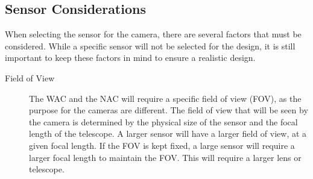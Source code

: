 \subsection{Sensor Considerations}
When selecting the sensor for the camera, there are several factors that must be considered. While a specific sensor will not be selected for the design, it is still important to keep these factors in mind to ensure a realistic design.  
\begin{description}
\item[Field of View] The WAC and the NAC will require a specific field of view (FOV), as the purpose for the cameras are different. The field of view that will be seen by the camera is determined by the physical size of the sensor and the focal length of the telescope. A larger sensor will have a larger field of view, at a given focal length. If the FOV is kept fixed, a large sensor will require a larger focal length to maintain the FOV. This will require a larger lens or telescope\cite{sbig2014}. 


\end{description}
